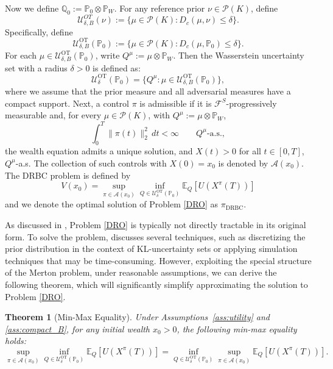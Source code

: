 \documentclass[11pt]{article}
\newtheorem{theorem}{Theorem}
\theoremstyle{definition}
\begin{document}
Now we define ${\mathbb{Q}_0} := \mathbb{P}_0 \otimes \mathbb{P}_W$. 
{For any reference prior \(\nu\in\mathcal P(K)\), define
\[
\mathcal{U}_{\delta,B}^{OT}(\nu)
:=
\{\mu\in\mathcal P(K):D_c(\mu,\nu)\le\delta\}.
\]
Specifically, define 
\[
\mathcal U_{\delta,B}^{\text{OT}}(\mathbb P_0)
:=
\{\mu\in\mathcal P(K):D_c(\mu,\mathbb P_0)\le \delta\}.
\]
For each \(\mu\in\mathcal U_{\delta,B}^{\text{OT}}(\mathbb P_0)\), write $
Q^\mu:=\mu\otimes \mathbb{P}_W$. 
Then the Wasserstein uncertainty set with a radius $\delta > 0$ is defined as:
\[
\mathcal U_\delta^{\text{OT}}(\mathbb P_0)
=
\{{Q}^\mu:\mu\in\mathcal U_{\delta,B}^{\text{OT}}(\mathbb P_0)\},
\]
where we assume that the prior measure and all adversarial measures have a compact support. 
Next,}
{
a control \(\pi\) is admissible if it is \(\mathcal F^S\)-progressively measurable and,
for every \(\mu\in\mathcal P(K)\), with \(Q^\mu:=\mu\otimes \mathbb P_W\),
\[
\int_0^T \|\pi(t)\|_2^2\,dt<\infty\qquad Q^\mu\text{-a.s.},
\]
the wealth equation admits a unique solution, and \(X(t)>0\) for all \(t\in[0,T]\),
\(Q^\mu\)-a.s. The collection of such controls with \(X(0)=x_0\) is denoted by
\(\mathcal A(x_0)\). }
The DRBC problem is defined by 
\begin{equation}\label{DRO}
  V(x_0) = \sup_{\pi \in \mathcal{A}(x_0)} 
\inf_{{Q} \in \mathcal{U}^{\text{OT}}_{\delta}(\mathbb{P}_0)} \mathbb{E}_{{Q}}\left[U(X^{\pi}(T))\right] 
\end{equation}
and we denote the optimal solution of Problem \eqref{DRO} as $\pi_{\text{DRBC}}$.


As discussed in \cite{Blanchet2025Duality}, Problem \eqref{DRO} is typically not directly tractable in its original form. To solve the problem, \cite{Blanchet2025Duality} discusses several techniques, such as discretizing the prior distribution in the context of KL-uncertainty sets or applying simulation techniques that may be time-consuming. However, exploiting the special structure of the Merton problem, under reasonable assumptions, we can derive the following theorem, which will significantly simplify approximating the solution to Problem \eqref{DRO}. 


\begin{theorem}[Min-Max Equality]
\label{thm:minmax}
Under Assumptions~\ref{ass:utility} and \ref{ass:compact_B}, for any initial wealth $x_0 > 0$, the following min-max equality holds:
$$
\sup_{\pi \in \mathcal{A}(x_0)} \inf_{{Q} \in \mathcal{U}^{\text{OT}}_{\delta}(\mathbb{P}_0)} \mathbb{E}_{Q}[U(X^\pi(T))] = \inf_{{Q} \in \mathcal{U}^{\text{OT}}_{\delta}(\mathbb{P}_0)} \sup_{\pi \in \mathcal{A}(x_0)} \mathbb{E}_{Q}[U(X^\pi(T))].
$$
\end{theorem}
\end{document}
